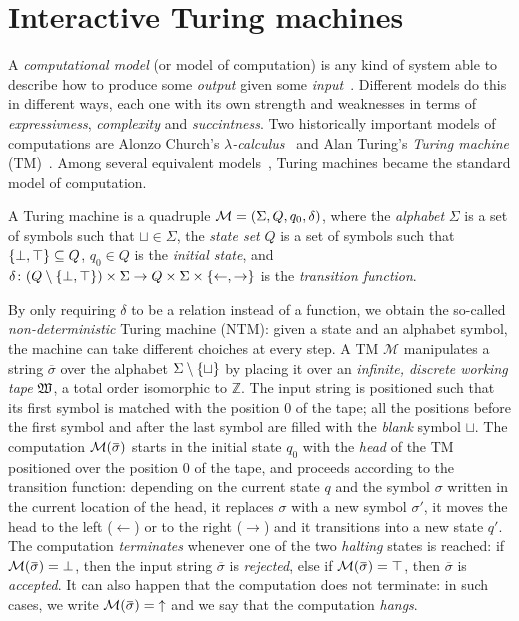 \section{Interactive Turing machines}\label{sec:interactive_tm}
A \emph{computational model} (or model of computation) is any kind of system able to describe 
how to produce some \emph{output} given some \emph{input}~\cite{Savage1997}.
Different models do this in different ways, each one with its own strength and weaknesses in terms
of \emph{expressivness}, \emph{complexity} and \emph{succintness}.
Two historically important models of computations are Alonzo Church's 
\emph{\(\lambda \)-calculus}~\cite{Church1941} and Alan Turing's 
\emph{Turing machine} (TM)~\cite{Turing1950}. 
Among several equivalent models~\cite{Davis2004}, Turing machines became the standard model of 
computation.
\begin{definition}\label{def:turing_machine}
  A Turing machine is a quadruple \(\mathcal{M} = \Tuple{\Sigma, Q, q_0, \delta}\), where 
  the \emph{alphabet} \(\Sigma \) is a set of symbols such that \(\sqcup \in \Sigma \), the 
  \emph{state set} \(Q\) is a set of symbols such that \(\Set{\bot, \top} \subseteq Q\), 
  \(q_0 \in Q\) is the \emph{initial state}, and 
  \(\delta\colon {\Parens*{Q \setminus \Set{\bot, \top}} \times \Sigma} \to 
  {Q \times \Sigma \times \Set{\leftarrow, \rightarrow}}\) is the \emph{transition function}.
\end{definition}

By only requiring \(\delta \) to be a relation instead of a function, we obtain the so-called 
\emph{non-deterministic} Turing machine (NTM): given a state and an alphabet symbol, the machine 
can take different choiches at every step.
A TM \(\mathcal{M}\) manipulates a string \(\overbar{\sigma}\) over the alphabet 
\(\Sigma \setminus \Set{\sqcup}\) by placing it over an \emph{infinite, discrete working tape} 
\(\Tapework \), a total order isomorphic to \(\mathbb{Z}\).
The input string is positioned such that its first symbol is matched with the position \(0\) 
of the tape; all the positions before the first symbol and after the last symbol are filled 
with the \emph{blank} symbol \(\sqcup \).
The computation \(\call{\mathcal{M}}{\overbar{\sigma}}\) starts in the initial state \(q_0\) with 
the \emph{head} of the TM positioned over the position \(0\) of the tape, and proceeds according to 
the transition function: depending on the current state \(q\) and the symbol \(\sigma \) written in 
the current location of the head, it replaces \(\sigma \) with a new symbol \(\sigma'\), it moves 
the head to the left (\(\leftarrow \)) or to the right (\(\rightarrow \)) and it transitions into a 
new state \(q'\).
The computation \emph{terminates} whenever one of the two \emph{halting} states is reached: if
\(\call{\mathcal{M}}{\overbar{\sigma}} = \bot \), then the input string \(\overbar{\sigma}\) is 
\emph{rejected}, else if \(\call{\mathcal{M}}{\overbar{\sigma}} = \top \), then \(\overbar{\sigma}\) 
is \emph{accepted}.
It can also happen that the computation does not terminate: in such cases, we write 
\(\call{\mathcal{M}}{\overbar{\sigma}} = {\uparrow}\) and we say that the computation \emph{hangs}.

